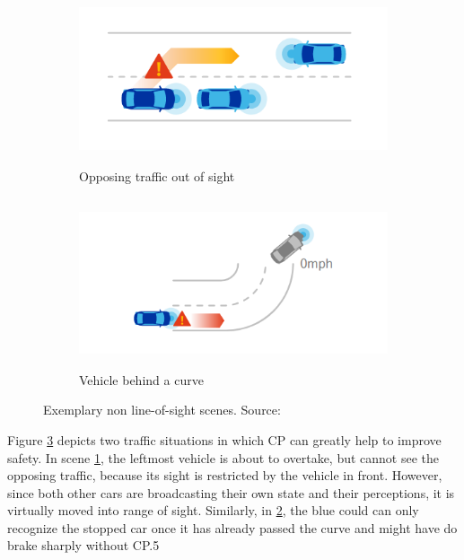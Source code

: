 \begin{figure}[h]
	
	\begin{subfigure}{0.5\textwidth}
		\includegraphics[width=1.0\linewidth, height=5cm]{98_images/nloss_2.png} 
		\caption{Opposing traffic out of sight}
		\label{fig:cp_use_cases_1}
	\end{subfigure}
	\begin{subfigure}{0.5\textwidth}
		\includegraphics[width=1.2\linewidth, height=5cm]{98_images/nloss_3.png}
		\caption{Vehicle behind a curve}
		\label{fig:cp_use_cases_2}
	\end{subfigure}
	
	\caption{Exemplary non line-of-sight scenes. Source: \cite{QualcommTechnologiesInc.2017}}
	\label{fig:cp_use_cases}
\end{figure}

Figure \ref{fig:cp_use_cases} depicts two traffic situations in which CP can greatly help to improve safety. In scene \ref{fig:cp_use_cases_1}, the leftmost vehicle is about to overtake, but cannot see the opposing traffic, because its sight is restricted by the vehicle in front. However, since both other cars are broadcasting their own state and their perceptions, it is virtually moved into range of sight. Similarly, in \ref{fig:cp_use_cases_2}, the blue could can only recognize the stopped car once it has already passed the curve and might have do brake sharply without CP.5